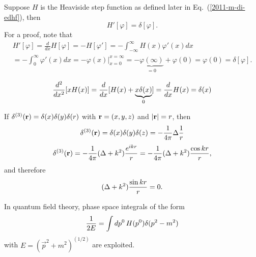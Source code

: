 Suppose $H$ is the
{Heaviside step function}
as defined later in Eq.~(\ref{2011-m-di-edhf}), then
 \begin{equation}
H' [\varphi] =\delta[\varphi]
.
\end{equation}
{\color{OliveGreen}
\bproof
For a proof, note that
 \begin{equation}
 \begin{split}
H'[\varphi] =\frac{d}{dx}H[\varphi ] = -H[\varphi']=
-\int_{-\infty}^\infty H (x)  \varphi'(x) dx
\\
=
-\int_{0}^\infty   \varphi'(x) dx
=
-\left. \varphi (x) \right|_{x=0}^{x=\infty} =   - \underbrace{\varphi (\infty )}_{=0} +\varphi (0)= \varphi (0) =\delta[\varphi ]
.
 \end{split}
 \end{equation}
\eproof
}



 \begin{equation}
 {d^2\over dx^2}[x H (x)] = {d \over dx }[H(x) + \underbrace{x \delta  (x)}_{0}]={d \over dx } H(x)  = \delta (x)
 \end{equation}

If $ \delta^{(3)} ({\bf r})=
\delta (x)
\delta (y)
\delta (r)$ with ${\bf r}=(x,y,z)$ and $\vert {\bf r}\vert=r$, then
 \begin{equation}
 \delta^{(3)} ({\bf r})=\delta (x)\delta (y)\delta (z)=-{1\over 4\pi }\Delta {1\over  r }
 \end{equation}
 \begin{equation}
 \delta^{(3)}  ({\bf r})=-{1\over 4\pi }(\Delta +k^2){e^{ikr}\over r} = -{1\over 4\pi }(\Delta +k^2){\cos kr\over r},
 \end{equation}
and therefore
\begin{equation}
 (\Delta +k^2){\sin kr\over r} = 0.
 \end{equation}

In quantum field theory,  phase space integrals of the form
 \begin{equation}
 {1\over 2E}=\int dp^0 \, H (p^0)\delta (p^2-m^2)
 \end{equation}
 with $E=({\vec p}^2+m^2)^{(1/2)}$
 are exploited.

